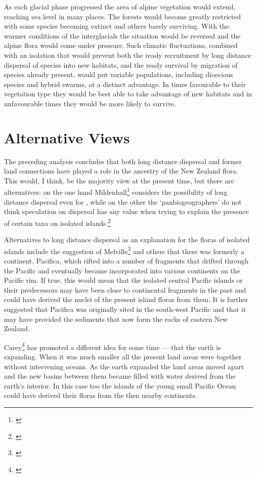 As each glacial phase progressed the area of alpine vegetation would extend, reaching sea level in many places.
The forests would become greatly restricted with some species becoming extinct and others barely surviving.
With the warmer conditions of the interglacials the situation would be reversed and the alpine flora would come under pressure.
Such climatic fluctuations, combined with an isolation that would prevent both the ready recruitment by long distance dispersal of species into new habitats, and the ready survival by migration of species already present, would put variable populations, including dioecious species and hybrid swarms, at a distinct advantage.
In times favourable to their vegetation type they would be best able to take advantage of new habitats and in unfavourable times they would be more likely to survive.

\section{Alternative Views}

The preceding analysis concludes that both long distance dispersal and former land connections have played a role in the ancestry of the New Zealand flora.
This would, I think, be the majority view at the present time, but there are alternatives: on the one hand Mildenhall\footnote{\cite{mildenhall1980new}} considers the possibility of long distance dispersal even for , while on the other the `panbiogeographers' do not think speculation on dispersal has any value when trying to explain the presence of certain taxa on isolated islands.\footnote{\cite{craw1982phylogenetics}}

Alternatives to long distance dispersal as an explanation for the floras of isolated islands include the suggestion of Melville\footnote{\cite{melville1981vicarious}} and others that there was formerly a continent, Pacifica, which rifted into a number of fragments that drifted through the Pacific and eventually became incorporated into various continents on the Pacific rim.
If true, this would mean that the isolated central Pacific islands or their predecessors may have been close to continental fragments in the past and could have derived the nuclei of the present island floras from them.
It is further suggested that Pacifica was originally sited in the south-west Pacific and that it may have provided the sediments that now form the rocks of eastern New Zealand.

Carey\footnote{\cite{carey1983necessity}} has promoted a different idea for some time — that the earth is expanding.
When it was much smaller all the present land areas were together without intervening oceans.
As the earth expanded the land areas moved apart and the new basins between them became filled with water derived from the earth's interior.
In this case too the islands of the young small Pacific Ocean could have derived their floras from the then nearby continents.

